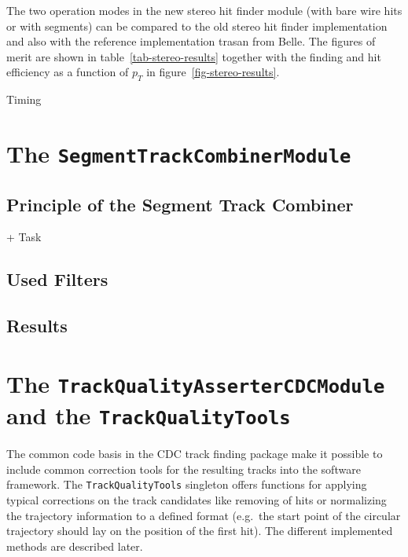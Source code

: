 The two operation modes in the new stereo hit finder module (with bare wire hits or with segments) can be compared to the old stereo hit finder implementation and also with the reference implementation trasan from Belle. The figures of merit are shown in table~\ref{tab-stereo-results} together with the finding and hit efficiency as a function of $p_T$ in figure~\ref{fig-stereo-results}. 

Timing

\section{The \texttt{SegmentTrackCombinerModule}} \label{section-combiner}
\subsection{Principle of the Segment Track Combiner}
+ Task
\subsection{Used Filters}
\subsection{Results}

\section{The \texttt{Track\-Quality\-Asserter\-CDC\-Module} and the \texttt{Track\-Quality\-Tools}}  \label{section-quality}

The common code basis in the CDC track finding package make it possible to include common correction tools for the resulting tracks into the software framework. The \texttt{Track\-Quality\-Tools} singleton offers functions for applying typical corrections on the track candidates like removing of hits or normalizing the trajectory information to a defined format (e.g.\ the start point of the circular trajectory should lay on the position of the first hit). The different implemented methods are described later.

